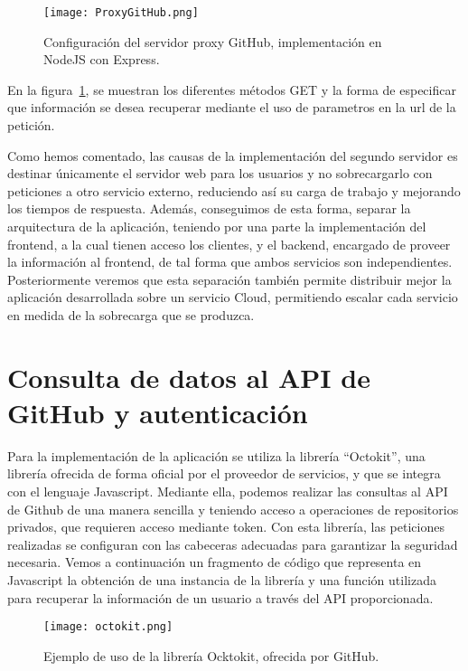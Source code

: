 \begin{figure}[h!]
  \texttt{[image: ProxyGitHub.png]}
  \caption{Configuración del servidor proxy GitHub, implementación en
    NodeJS con Express.}
  \label{figure:ProxyGitHub}
\end{figure}

En la figura~\ref{figure:ProxyGitHub}, se muestran los diferentes métodos
GET y la forma de especificar que información se desea recuperar mediante
el uso de parametros en la url de la petición.


Como hemos comentado, las causas de la implementación del segundo servidor
es destinar únicamente el servidor web para los usuarios y no sobrecargarlo
con peticiones a otro servicio externo, reduciendo así su carga de trabajo
y mejorando los tiempos de respuesta. Además, conseguimos de esta forma,
separar la arquitectura de la aplicación, teniendo por una parte la
implementación del frontend, a la cual tienen acceso los clientes, y el
backend, encargado de proveer la información al frontend, de tal forma que
ambos servicios son independientes.
Posteriormente veremos que esta separación también permite distribuir mejor
la aplicación desarrollada sobre un servicio Cloud, permitiendo escalar
cada servicio en medida de la sobrecarga que se produzca.


\section{Consulta de datos al API de GitHub y autenticación}

Para la implementación de la aplicación se utiliza la librería
“Octokit”\cite{Octokit,OctokitDoc}, una librería ofrecida de forma oficial
por el proveedor de servicios, y que se integra con el lenguaje Javascript.
Mediante ella, podemos realizar las consultas al API de Github de una
manera sencilla y teniendo acceso a operaciones de repositorios privados,
que requieren acceso mediante token. Con esta librería, las peticiones
realizadas se configuran con las cabeceras adecuadas para garantizar la
seguridad necesaria. Vemos a continuación un fragmento de código que
representa en Javascript la obtención de una instancia de la librería y una
función utilizada para recuperar la información de un usuario a través del
API proporcionada.


\begin{figure}[h!]
  \centerline{\texttt{[image: octokit.png]}}
  \caption{Ejemplo de uso de la librería Ocktokit, ofrecida por GitHub.}
  \label{figure:octokit}
\end{figure}

